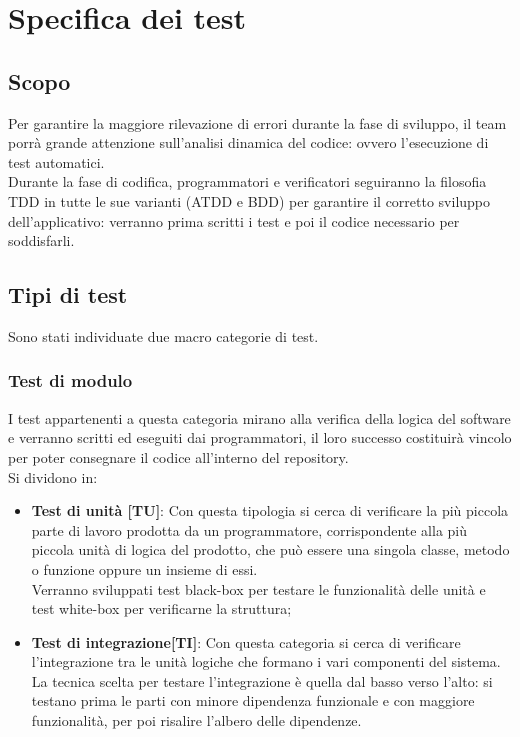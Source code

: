 \documentclass[PianoDiProgetto.tex]{subfiles}
\begin{document}
\chapter{Specifica dei test}

\section{Scopo}
Per garantire la maggiore rilevazione di errori durante la fase di sviluppo, il team porrà grande attenzione sull'analisi dinamica del codice: ovvero l'esecuzione di test automatici. \\
Durante la fase di codifica, programmatori e verificatori seguiranno la filosofia TDD in tutte le sue varianti (ATDD e BDD) per garantire il corretto sviluppo dell'applicativo: verranno prima scritti i test e poi il codice necessario per soddisfarli.

\section{Tipi di test}
Sono stati individuate due macro categorie di test.

\subsection{Test di modulo}
I test appartenenti a questa categoria mirano alla verifica della logica del software e verranno scritti ed eseguiti dai programmatori, il loro successo costituirà vincolo per poter consegnare il codice all'interno del repository. \\
Si dividono in:
\begin{itemize}
	\item \textbf{Test di unità [TU]}: Con questa tipologia si cerca di verificare la più piccola parte di lavoro prodotta da un programmatore, corrispondente alla più piccola unità di logica del prodotto, che può essere una singola classe, metodo o funzione oppure un insieme di essi. \\
	Verranno sviluppati test black-box per testare le funzionalità delle unità e test white-box per verificarne la struttura;
	\item \textbf{Test di integrazione[TI]}: Con questa categoria si cerca di verificare l'integrazione tra le unità logiche che formano i vari componenti del sistema.\\
	La tecnica scelta per testare l'integrazione è quella dal basso verso l'alto: si testano prima le parti con minore dipendenza funzionale e con maggiore funzionalità, per poi risalire l'albero delle dipendenze.\\
\end{itemize}
\end{document}
